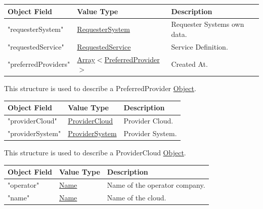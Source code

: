 \documentclass[a4paper]{arrowhead}
\newcommand{\mref}[1]{{\textcolor{ArrowheadPurple}{\hyperref[sec:model:#1]{#1}}}}
\newcommand{\pref}[1]{{\textcolor{ArrowheadGrey}{\hyperref[sec:model:primitives:#1]{#1}}}}
\begin{document}
\begin{table}[ht!]
\begin{tabularx}{\textwidth}{| p{5cm} | p{6cm} | X |} \hline
\rowcolor{gray!33} Object Field & Value Type                      & Description \\ \hline
"requesterSystem"    & \pref{RequesterSystem}                     & Requester Systems own data. \\ \hline
"requestedService"   & \pref{RequestedService}                    & Service Definition. \\ \hline
"preferredProviders" & \pref{Array}$<$\mref{PreferredProvider}$>$ & Created At. \\ \hline


\end{tabularx}
\end{table}


This structure is used to describe a PreferredProvider \pref{Object}. 

\begin{table}[ht!]
\begin{tabularx}{\textwidth}{| p{5cm} | p{6cm} | X |} \hline
\rowcolor{gray!33} Object Field & Value Type                      & Description \\ \hline
"providerCloud"         & \pref{ProviderCloud}     & Provider Cloud. \\ \hline
"providerSystem"            & \pref{ProviderSystem}   & Provider System. \\ \hline

\end{tabularx}
\end{table}


This structure is used to describe a ProviderCloud \pref{Object}. 

\begin{table}[ht!]
\begin{tabularx}{\textwidth}{| p{5cm} | p{6cm} | X |} \hline
\rowcolor{gray!33} Object Field & Value Type                      & Description \\ \hline
"operator"         & \pref{Name}     & Name of the operator company. \\ \hline
"name"            & \pref{Name}   & Name of the cloud. \\ \hline

\end{tabularx}
\end{table}
\end{document}
